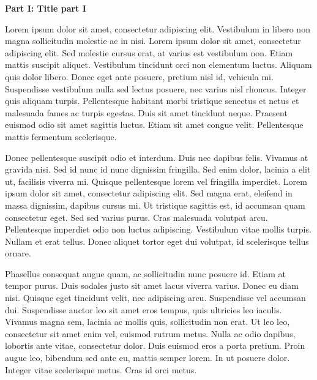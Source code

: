 
\clearpage
{}
\begin{center}
\LARGE \sffamily \bfseries
Part I: Title part I
\end{center}

\thispagestyle{empty}

\normalsize

\begin{center}

\vspace{3em}
\begin{minipage}{.9\textwidth}

Lorem ipsum dolor sit amet, consectetur adipiscing elit. Vestibulum in libero non magna sollicitudin molestie ac in nisi. Lorem ipsum dolor sit amet, consectetur adipiscing elit. Sed molestie cursus erat, at varius est vestibulum non. Etiam mattis suscipit aliquet. Vestibulum tincidunt orci non elementum luctus. Aliquam quis dolor libero. Donec eget ante posuere, pretium nisl id, vehicula mi. Suspendisse vestibulum nulla sed lectus posuere, nec varius nisl rhoncus. Integer quis aliquam turpis. Pellentesque habitant morbi tristique senectus et netus et malesuada fames ac turpis egestas. Duis sit amet tincidunt neque. Praesent euismod odio sit amet sagittis luctus. Etiam sit amet congue velit. Pellentesque mattis fermentum scelerisque.

Donec pellentesque suscipit odio et interdum. Duis nec dapibus felis. Vivamus at gravida nisi. Sed id nunc id nunc dignissim fringilla. Sed enim dolor, lacinia a elit ut, facilisis viverra mi. Quisque pellentesque lorem vel fringilla imperdiet. Lorem ipsum dolor sit amet, consectetur adipiscing elit. Sed magna erat, eleifend in massa dignissim, dapibus cursus mi. Ut tristique sagittis est, id accumsan quam consectetur eget. Sed sed varius purus. Cras malesuada volutpat arcu. Pellentesque imperdiet odio non luctus adipiscing. Vestibulum vitae mollis turpis. Nullam et erat tellus. Donec aliquet tortor eget dui volutpat, id scelerisque tellus ornare.

Phasellus consequat augue quam, ac sollicitudin nunc posuere id. Etiam at tempor purus. Duis sodales justo sit amet lacus viverra varius. Donec eu diam nisi. Quisque eget tincidunt velit, nec adipiscing arcu. Suspendisse vel accumsan dui. Suspendisse auctor leo sit amet eros tempus, quis ultricies leo iaculis. Vivamus magna sem, lacinia ac mollis quis, sollicitudin non erat. Ut leo leo, consectetur sit amet enim vel, euismod rutrum metus. Nulla ac odio dapibus, lobortis ante vitae, consectetur dolor. Duis euismod eros a porta pretium. Proin augue leo, bibendum sed ante eu, mattis semper lorem. In ut posuere dolor. Integer vitae scelerisque metus. Cras id orci metus.


\end{minipage}
\end{center}

